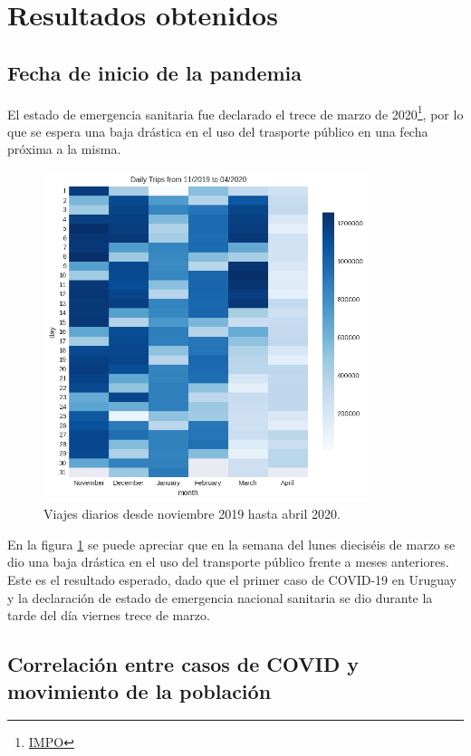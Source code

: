 \documentclass[conference]{IEEEtran}
\begin{document}
\section{Resultados obtenidos}

\subsection{Fecha de inicio de la pandemia}
El estado de emergencia sanitaria fue declarado el trece de marzo de 2020\footnote{\href{https://www.impo.com.uy/bases/decretos/93-2020}{IMPO}}, por lo que se espera una baja drástica en el uso del trasporte público en una fecha próxima a la misma.

\begin{figure}[htbp]
\centerline{\includegraphics[width=95mm]{Pictures/dthm.png}}
\caption{Viajes diarios desde noviembre 2019 hasta abril 2020.}
\label{dthm}
\end{figure}

En la figura \ref{dthm} se puede apreciar que en la semana del lunes dieciséis de marzo se dio una baja drástica en el uso del transporte público frente a meses anteriores. Este es el resultado esperado, dado que el primer caso de COVID-19 en Uruguay y la declaración de estado de emergencia nacional sanitaria se dio durante la tarde del día viernes trece de marzo.

\subsection{Correlación entre casos de COVID y movimiento de la población}
\end{document}

